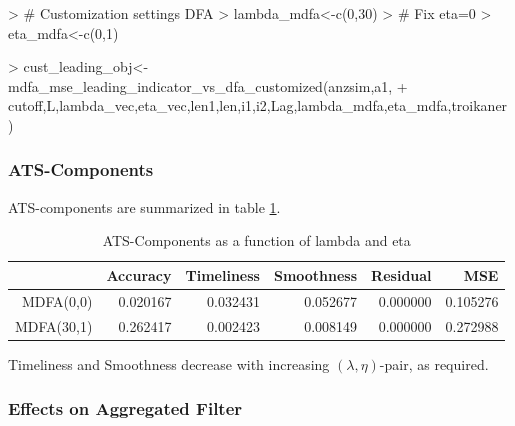 \documentclass[a4paper]{book}
\begin{document}
\begin{Schunk}
\begin{Sinput}
> # Customization settings DFA
> lambda_mdfa<-c(0,30)
> # Fix eta=0
> eta_mdfa<-c(0,1)
\end{Sinput}
\end{Schunk}
\begin{Schunk}
\begin{Sinput}
> cust_leading_obj<-mdfa_mse_leading_indicator_vs_dfa_customized(anzsim,a1,
+     cutoff,L,lambda_vec,eta_vec,len1,len,i1,i2,Lag,lambda_mdfa,eta_mdfa,troikaner)  
\end{Sinput}
\end{Schunk}


\subsubsection{ATS-Components}

ATS-components are summarized in table \ref{ats_comp_mdfa_ST}.
\begin{table}[ht]
\centering
\begin{tabular}{rrrrrr}
  \hline
 & Accuracy & Timeliness & Smoothness & Residual & MSE \\ 
  \hline
MDFA(0,0) & 0.020167 & 0.032431 & 0.052677 & 0.000000 & 0.105276 \\ 
  MDFA(30,1) & 0.262417 & 0.002423 & 0.008149 & 0.000000 & 0.272988 \\ 
   \hline
\end{tabular}
\caption{ATS-Components as a function of lambda and eta} 
\label{ats_comp_mdfa_ST}
\end{table}Timeliness and Smoothness decrease  with increasing $(\lambda,\eta)$-pair, as required. 




\subsubsection{Effects on Aggregated Filter}
\end{document}
